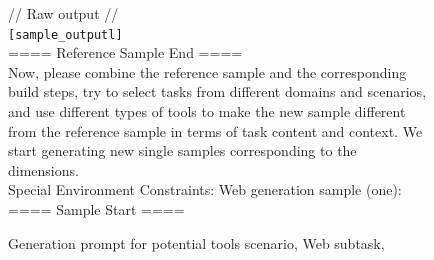 \begin{figure}[!htb]
\begin{tcolorbox}[
    colback=white, 
    colframe=blue2,
    boxrule=0.5mm,
    arc=0mm,
    outer arc=0mm,
    title=Potential Tools: Web - Generation Prompt
]
// Raw output //\\
\colorbox{blue2!50}{\texttt{[sample\_outputl]}}\\
==== Reference Sample End ====\\

Now, please combine the reference sample and the corresponding build steps, try to select tasks from different domains and scenarios, and use different types of tools to make the new sample different from the reference sample in terms of task content and context. We start generating new single samples corresponding to the dimensions.\\
Special Environment Constraints: Web generation sample (one):\\
==== Sample Start ====
\end{tcolorbox}
\caption{Generation prompt for potential tools scenario, Web subtask,}
\label{fig:web-prompt}
\end{figure}